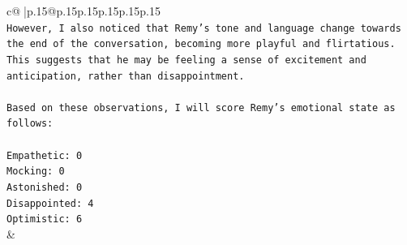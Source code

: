 \documentclass{article}
\begin{document}
{\begin{supertabular}{c@{$\;$}|p{.15\linewidth}@{}p{.15\linewidth}p{.15\linewidth}p{.15\linewidth}p{.15\linewidth}p{.15\linewidth}}
{{{\\ 
\texttt{However, I also noticed that Remy's tone and language change towards the end of the conversation, becoming more playful and flirtatious. This suggests that he may be feeling a sense of excitement and anticipation, rather than disappointment.} \\
\\ 
\texttt{Based on these observations, I will score Remy's emotional state as follows:} \\
\\ 
\texttt{Empathetic: 0} \\
\texttt{Mocking: 0} \\
\texttt{Astonished: 0} \\
\texttt{Disappointed: 4} \\
\texttt{Optimistic: 6} \\
            }
        }
    }
    & \\ \\

\end{supertabular}
}
\end{document}
